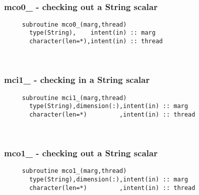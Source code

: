  
\mbox{}\hrulefill\ 

  \subsubsection{mco0\_ - checking out a String scalar}

\begin{verbatim} 
     subroutine mco0_(marg,thread)
       type(String),    intent(in) :: marg
       character(len=*),intent(in) :: thread
 \end{verbatim}%
 
 
\mbox{}\hrulefill\ 
 
  \subsubsection{mci1\_ - checking in a String scalar}

\begin{verbatim} 
     subroutine mci1_(marg,thread)
       type(String),dimension(:),intent(in) :: marg
       character(len=*)         ,intent(in) :: thread
 \end{verbatim}%
 
 
\mbox{}\hrulefill\ 

  \subsubsection{mco1\_ - checking out a String scalar}

\begin{verbatim} 
     subroutine mco1_(marg,thread)
       type(String),dimension(:),intent(in) :: marg
       character(len=*)         ,intent(in) :: thread
 \end{verbatim}%
 
